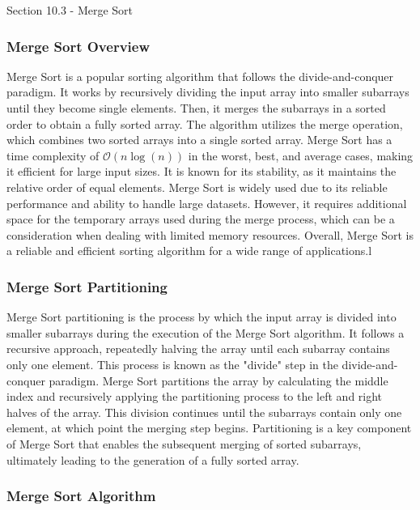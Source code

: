 \begin{notes}{Section 10.3 - Merge Sort}
    \subsubsection*{Merge Sort Overview}

    Merge Sort is a popular sorting algorithm that follows the divide-and-conquer paradigm. It works by recursively dividing the input array into smaller subarrays until they become single elements. Then, it merges the subarrays in a sorted order to obtain a fully sorted array. The algorithm utilizes the merge operation, which combines two sorted arrays 
    into a single sorted array. Merge Sort has a time complexity of $\mathcal{O}(n\log{(n)})$ in the worst, best, and average cases, making it efficient for large input sizes. It is known for its stability, as it maintains the relative order of equal elements. Merge Sort is widely used due to its reliable performance and ability to handle large datasets. However, it 
    requires additional space for the temporary arrays used during the merge process, which can be a consideration when dealing with limited memory resources. Overall, Merge Sort is a reliable and efficient sorting algorithm for a wide range of applications.l
    
    \subsubsection*{Merge Sort Partitioning}
    
    Merge Sort partitioning is the process by which the input array is divided into smaller subarrays during the execution of the Merge Sort algorithm. It follows a recursive approach, repeatedly halving the array until each subarray contains only one element. This process is known as the "divide" step in the divide-and-conquer paradigm. Merge Sort 
    partitions the array by calculating the middle index and recursively applying the partitioning process to the left and right halves of the array. This division continues until the subarrays contain only one element, at which point the merging step begins. Partitioning is a key component of Merge Sort that enables the subsequent merging of sorted 
    subarrays, ultimately leading to the generation of a fully sorted array.
    
    \subsubsection*{Merge Sort Algorithm}
    

\end{notes}
